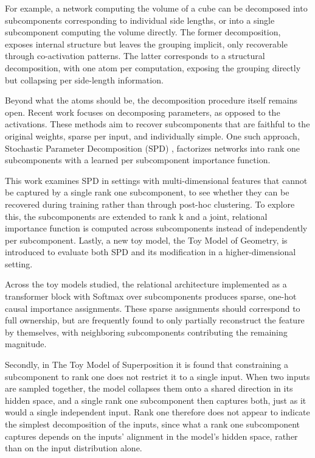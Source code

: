 \documentclass{article}
\begin{document}
For example, a network computing the volume of a cube can be
decomposed into subcomponents corresponding to individual side
lengths, or into a single subcomponent computing the volume directly.
The former decomposition, exposes internal
structure but leaves the grouping implicit, only recoverable
through co-activation patterns. The latter corresponds
to a structural decomposition, with one atom per
computation, exposing the grouping directly but collapsing per side-length information.

Beyond what the atoms should be, the decomposition procedure itself remains open.
Recent work focuses on decomposing parameters, as opposed to the activations.
These methods aim to recover subcomponents that are faithful to the original weights, sparse per input, and individually simple. 
One such approach, Stochastic Parameter Decomposition (SPD) \autocite{stochasticparameterdecomposition}, factorizes networks into rank one subcomponents with a learned per subcomponent importance
function.

This work examines SPD in settings with multi-dimensional
features that cannot be captured by a single rank one subcomponent,
to see whether they can be recovered during training rather than
through post-hoc clustering.
To
explore this, the subcomponents are extended to rank k and a joint, relational importance function
is computed across subcomponents instead of independently per subcomponent. 
Lastly, a new toy model, the Toy
Model of Geometry, is introduced to evaluate both SPD and its modification in a higher-dimensional setting.

Across the toy models studied, the relational architecture implemented as a transformer
block with Softmax over subcomponents produces sparse, one-hot causal importance
assignments. These sparse assignments should correspond to full ownership, but
are frequently found to only partially reconstruct the feature by themselves,
with neighboring subcomponents contributing the remaining magnitude.

Secondly, in The Toy Model of Superposition it is found
that constraining a subcomponent to rank one does not restrict
it to a single input. When two inputs are sampled together,
the model collapses them onto a shared direction in its hidden space,
and a single rank one subcomponent then captures both,
just as it would a single independent input. Rank one therefore
does not appear to indicate the simplest decomposition of the inputs,
since what a rank one subcomponent captures depends on
the inputs' alignment in the model's hidden space, rather than on the input distribution alone.
\end{document}
